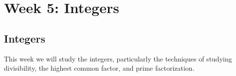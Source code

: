 \documentclass[11pt,dvipsnames]{book}
\numberwithin{equation}{section} %
\numberwithin{figure}{section} %
\numberwithin{table}{section} %
\begin{document}




\pagestyle{empty} %

 \tableofcontents %

\cleardoublepage %

\pagestyle{fancy} %












\part{Week 5: Integers}
\setcounter{page}{1}
\setcounter{chapter}{10}

\chapter{Integers}




This week we will study the integers, particularly the techniques of studying divisibility, the highest common factor, and prime factorization. 
\end{document}
